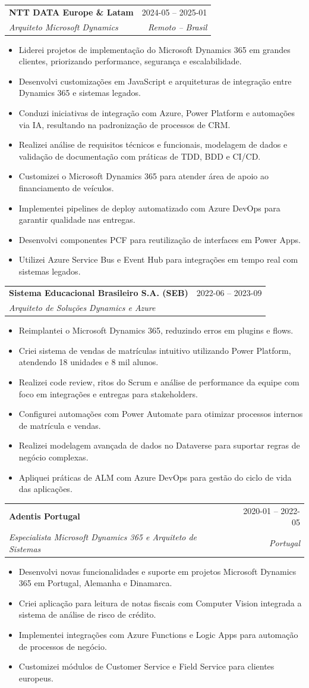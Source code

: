 \documentclass[a4paper,11pt]{article}
\makeatletter
\newcommand{\resumeItem}[1]{
  \item\small{
    {#1 \vspace{-2pt}}
  }
}
\newcommand{\resumeSubheading}[4]{
  \vspace{-1pt}\item
  \begin{tabular*}{0.97\textwidth}{l@{\extracolsep{\fill}}r}
    \textbf{#1} & #2 \\
    \textit{\small#3} & \textit{\small #4} \\
  \end{tabular*}\vspace{-5pt}
}
\newcommand{\resumeItemListStart}{\begin{itemize}}
\newcommand{\resumeItemListEnd}{\end{itemize}\vspace{-5pt}}
\makeatother
\begin{document}
\resumeSubheading
{NTT DATA Europe \& Latam}{2024-05 – 2025-01}
{Arquiteto Microsoft Dynamics}{Remoto – Brasil}
\resumeItemListStart
\resumeItem{Liderei projetos de implementação do Microsoft Dynamics 365 em grandes clientes, priorizando performance, segurança e escalabilidade.}
\resumeItem{Desenvolvi customizações em JavaScript e arquiteturas de integração entre Dynamics 365 e sistemas legados.}
\resumeItem{Conduzi iniciativas de integração com Azure, Power Platform e automações via IA, resultando na padronização de processos de CRM.}
\resumeItem{Realizei análise de requisitos técnicos e funcionais, modelagem de dados e validação de documentação com práticas de TDD, BDD e CI/CD.}
\resumeItem{Customizei o Microsoft Dynamics 365 para atender área de apoio ao financiamento de veículos.}
\resumeItem{Implementei pipelines de deploy automatizado com Azure DevOps para garantir qualidade nas entregas.}
\resumeItem{Desenvolvi componentes PCF para reutilização de interfaces em Power Apps.}
\resumeItem{Utilizei Azure Service Bus e Event Hub para integrações em tempo real com sistemas legados.}
\resumeItemListEnd

\resumeSubheading
{Sistema Educacional Brasileiro S.A. (SEB)}{2022-06 – 2023-09}
{Arquiteto de Soluções Dynamics e Azure}{}
\resumeItemListStart
\resumeItem{Reimplantei o Microsoft Dynamics 365, reduzindo erros em plugins e flows.}
\resumeItem{Criei sistema de vendas de matrículas intuitivo utilizando Power Platform, atendendo 18 unidades e 8 mil alunos.}
\resumeItem{Realizei code review, ritos do Scrum e análise de performance da equipe com foco em integrações e entregas para stakeholders.}
\resumeItem{Configurei automações com Power Automate para otimizar processos internos de matrícula e vendas.}
\resumeItem{Realizei modelagem avançada de dados no Dataverse para suportar regras de negócio complexas.}
\resumeItem{Apliquei práticas de ALM com Azure DevOps para gestão do ciclo de vida das aplicações.}
\resumeItemListEnd

\resumeSubheading
{Adentis Portugal}{2020-01 – 2022-05}
{Especialista Microsoft Dynamics 365 e Arquiteto de Sistemas}{Portugal}
\resumeItemListStart
\resumeItem{Desenvolvi novas funcionalidades e suporte em projetos Microsoft Dynamics 365 em Portugal, Alemanha e Dinamarca.}
\resumeItem{Criei aplicação para leitura de notas fiscais com Computer Vision integrada a sistema de análise de risco de crédito.}
\resumeItem{Implementei integrações com Azure Functions e Logic Apps para automação de processos de negócio.}
\resumeItem{Customizei módulos de Customer Service e Field Service para clientes europeus.}
\resumeItemListEnd
\end{document}
